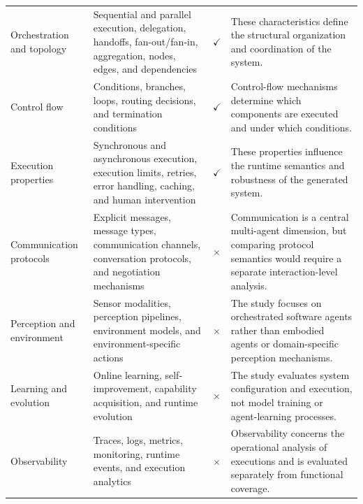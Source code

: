 \begin{table}[t]
\begin{tabularx}{\textwidth}{
        @{}
        p{}
        >{\raggedright\arraybackslash}X
        >{\centering\arraybackslash}p{}
        p{}
        @{}
    }
        Orchestration and topology
        & Sequential and parallel execution, delegation, handoffs,
        fan-out/fan-in, aggregation, nodes, edges, and dependencies
        & \(\checkmark\)
        & These characteristics define the structural organization and
        coordination of the system. \\

        Control flow
        & Conditions, branches, loops, routing decisions, and termination
        conditions
        & \(\checkmark\)
        & Control-flow mechanisms determine which components are executed
        and under which conditions. \\

        Execution properties
        & Synchronous and asynchronous execution, execution limits,
        retries, error handling, caching, and human intervention
        & \(\checkmark\)
        & These properties influence the runtime semantics and robustness
        of the generated system. \\

        \midrule

        Communication protocols
        & Explicit messages, message types, communication channels,
        conversation protocols, and negotiation mechanisms
        & \(\times\)
        & Communication is a central multi-agent dimension, but comparing
        protocol semantics would require a separate interaction-level
        analysis. \\

        Perception and environment
        & Sensor modalities, perception pipelines, environment models, and
        environment-specific actions
        & \(\times\)
        & The study focuses on orchestrated software agents rather than
        embodied agents or domain-specific perception mechanisms. \\

        Learning and evolution
        & Online learning, self-improvement, capability acquisition, and
        runtime evolution
        & \(\times\)
        & The study evaluates system configuration and execution, not
        model training or agent-learning processes. \\

        Observability
        & Traces, logs, metrics, monitoring, runtime events, and execution
        analytics
        & \(\times\)
        & Observability concerns the operational analysis of executions
        and is evaluated separately from functional coverage. \\


\end{tabularx}
\end{table}
